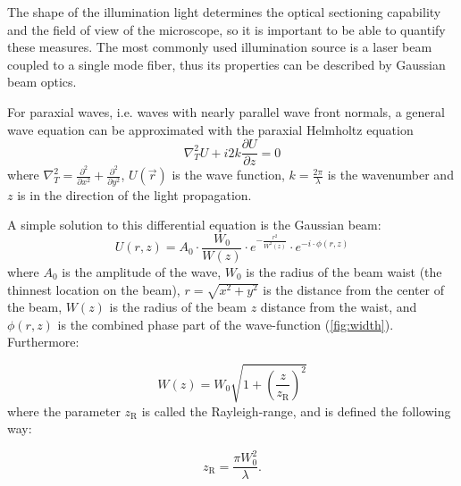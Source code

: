     The shape of the illumination light determines the optical sectioning capability and the field of view of the microscope, so it is important to be able to quantify these measures. The most commonly used illumination source is a laser beam coupled to a single mode fiber, thus its properties can be described by Gaussian beam optics.

    For paraxial waves, i.e. waves with nearly parallel wave front normals, a general wave equation can be approximated with the paraxial Helmholtz equation \cite{saleh_fundamentals_2007}
    \begin{equation}
      \nabla_T^2 U + i 2k \frac{\partial U}{\partial z} = 0
      \label{eq:helmholtz}
    \end{equation}
    where $\nabla_T^2 = \frac{\partial^2}{\partial x^2} + \frac{\partial^2}{\partial y^2}$, $U(\vec{r})$ is the wave function, $k=\frac{2\pi}{\lambda}$ is the wavenumber and $z$ is in the direction of the light propagation.
    
    A simple solution to this differential equation is the Gaussian beam:
    \begin{equation}
      U(r,z) = A_0 \cdot \frac{W_0}{W(z)} \cdot e^{-\frac{r^2}{W^2(z)}}\cdot e^{-i\cdot \phi(r,z)}
    \label{eq:gaussian}
    \end{equation}
    where $A_0$ is the amplitude of the wave, $W_0$ is the radius of the beam waist (the thinnest location on the beam), $r=\sqrt{x^2+y^2}$ is the distance from the center of the beam, $W(z)$ is the radius of the beam $z$ distance from the waist, and $\phi(r,z)$ is the combined phase part of the wave-function (\autoref{fig:width}). Furthermore:

    \begin{equation}
      W(z) = W_0\sqrt{1+\left( \frac{z}{z_\mathrm{R}} \right)^2}
    \end{equation}
    where the parameter $z_\mathrm{R}$ is called the Rayleigh-range, and is defined the following way:

    \begin{equation}
      z_\mathrm{R} = \frac{\pi W_0^2}{\lambda}.
      \label{eq:rayleigh}
    \end{equation}
    


